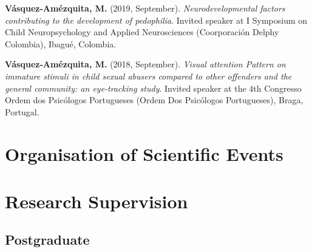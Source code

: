 \documentclass[11pt,a4paper,]{awesome-cv}
\begin{document}
\textbf{Vásquez-Amézquita, M.} (2019, September).
\emph{Neurodevelopmental factors contributing to the development of
pedophilia}. Invited speaker at I Symposium on Child Neuropsychology and
Applied Neurosciences (Coorporación Delphy Colombia), Ibagué, Colombia.

\textbf{Vásquez-Amézquita, M.} (2018, September). \emph{Visual attention
Pattern on immature stimuli in child sexual abusers compared to other
offenders and the general community: an eye-tracking study}. Invited
speaker at the 4th Congresso Ordem dos Psicólogos Portugueses (Ordem Dos
Psicólogos Portugueses), Braga, Portugal.

\endgroup

\hypertarget{organisation-of-scientific-events}{%
\section{Organisation of Scientific
Events}\label{organisation-of-scientific-events}}

\begin{cventries}
\end{cventries}

\hypertarget{research-supervision}{%
\section{Research Supervision}\label{research-supervision}}

\hypertarget{section-2}{%
\subsection{\texorpdfstring{\textbf{Postgraduate}}{}}\label{section-2}}
\end{document}
